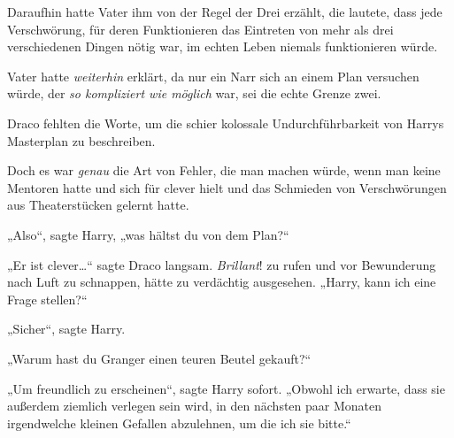 Daraufhin hatte Vater ihm von der Regel der Drei erzählt, die lautete, dass jede Verschwörung, für deren Funktionieren das Eintreten von mehr als drei verschiedenen Dingen nötig war, im echten Leben niemals funktionieren würde.

Vater hatte \emph{weiterhin} erklärt, da nur ein Narr sich an einem Plan versuchen würde, der \emph{so kompliziert wie möglich} war, sei die echte Grenze zwei.

Draco fehlten die Worte, um die schier kolossale Undurchführbarkeit von Harrys Masterplan zu beschreiben.

Doch es war \emph{genau} die Art von Fehler, die man machen würde, wenn man keine Mentoren hatte und sich für clever hielt und das Schmieden von Verschwörungen aus Theaterstücken gelernt hatte.

„Also“, sagte Harry, „was hältst du von dem Plan?“

„Er ist clever…“ sagte Draco langsam. \emph{Brillant}! zu rufen und vor Bewunderung nach Luft zu schnappen, hätte zu verdächtig ausgesehen. „Harry, kann ich eine Frage stellen?“

„Sicher“, sagte Harry.

„Warum hast du Granger einen teuren Beutel gekauft?“

„Um freundlich zu erscheinen“, sagte Harry sofort. „Obwohl ich erwarte, dass sie außerdem ziemlich verlegen sein wird, in den nächsten paar Monaten irgendwelche kleinen Gefallen abzulehnen, um die ich sie bitte.“

